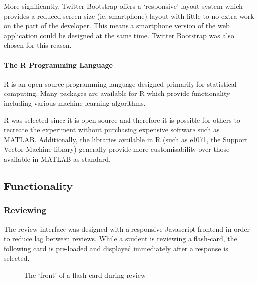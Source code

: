 More significantly, Twitter Bootstrap offers a `responsive' layout 
system which provides a reduced screen size (ie. smartphone) layout
 with little to no extra work on the part of the developer. This 
 means a smartphone version of the web application could be designed
  at the same time. Twitter Bootstrap was also chosen for this reason.
  
\paragraph{The R Programming Language}
R is an open source programming language designed primarily for statistical computing.
Many packages are available for R which provide functionality including various
machine learning algorithms.

R was selected since it is open source and therefore it is possible for others to recreate
the experiment without purchasing expensive software such as MATLAB. Additionally, the libraries
available in R (such as e1071, the Support Vector Machine library) generally provide more customisability
over those available in MATLAB as standard.

\subsection{Functionality}
\subsubsection{Reviewing}
The review interface was designed with a responsive Javascript frontend in order
to reduce lag between reviews. While a student is reviewing a flash-card, the following
card is pre-loaded and displayed immediately after a response is selected.
\begin{figure}
\caption{The `front' of a flash-card during review}
\label{fig_review_front}
\end{figure}

